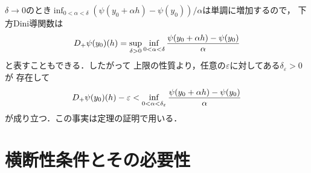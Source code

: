 \documentclass[a4paper,11pt]{jsarticle}
\DeclareRobustCommand{\lfrac}[2]{{\lower.4ex\hbox{\begingroup\ensuremath{#1}\endgroup}\over{\hspace{.2mm}#2\hspace{.2mm}}}}
\begin{document}
\newpage

$\delta \to 0$のとき$\inf_{0<\alpha<\delta}(\psi(y_0+\alpha h)-\psi(y_0))/\alpha$は単調に増加するので，
下方Dini導関数は
\begin{align*}
	D_{+}\psi(y_0)(h)=\sup_{\delta>0}\inf_{0<\alpha<\delta}\lfrac{\psi(y_0+\alpha h)-\psi(y_0)}{\alpha}
\end{align*}
と表すこともできる．したがって
上限の性質より，任意の$\varepsilon$に対してある$\delta_\varepsilon>0$が
存在して
\begin{align*}
	D_{+}\psi(y_0)(h)-\varepsilon<\inf_{0<\alpha<\delta_\varepsilon}\lfrac{\psi(y_0+\alpha h)-\psi(y_0)}{\alpha}
\end{align*}
が成り立つ．この事実は定理の証明で用いる．

\vspace{7mm}

\section{横断性条件とその必要性}

\vspace{2mm}
\end{document}
